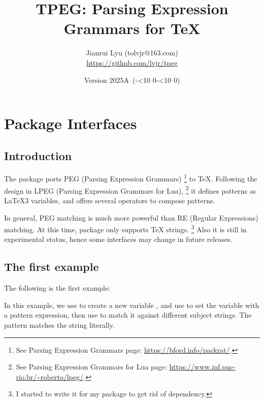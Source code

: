 \documentclass[oneside]{book}
\newcommand*{\myversion}{2025A}
\newcommand*{\mydate}{Version \myversion\ (\the\year-\mylpad\month-\mylpad\day)}
\newcommand*{\mylpad}[1]{\ifnum#1<10 0\the#1\else\the#1\fi}
\begin{document}
\title{\textsf{\color{green3}TPEG: Parsing Expression Grammars for TeX}}
\author{Jianrui Lyu (tolvjr@163.com)\\ \url{https://github.com/lvjr/tpeg}}
\date{\mydate}
\maketitle

\tableofcontents

\chapter{Package Interfaces}

\section{Introduction}

The  package ports PEG (Parsing Expression Grammars)%
\footnote{See Parsing Expression Grammars page: \url{https://bford.info/packrat/}.} to TeX.
Following the design in LPEG (Parsing Expression Grammars for Lua),%
\footnote{See Parsing Expression Grammars for Lua page: \url{https://www.inf.puc-rio.br/~roberto/lpeg/}.}
it defines patterns as LaTeX3 variables, and offers several operators to compose patterns.

In general, PEG matching is much more powerful than RE (Regular Expressions) matching.
At this time,  package only supports TeX strings.%
\footnote{I started to write it for my  package to get rid of  dependency.}
Also it is still in experimental status, hence some interfaces may change in future releases.

\section{The first example}

The following is the first example:
\begin{demohigh}
\NewTpeg\lMyTestTpeg
\SetTpeg{}
\IfTpegMatchTF{}
\IfTpegMatchTF{}
\IfTpegMatchTF{}
\IfTpegMatchTF{}
\end{demohigh}
In this example, we use \CC{\NewTpeg} to create a new  variable \VV{\lMyTestTpeg},
and use \CC{\SetTpeg} to set the variable with a pattern expression,
then use \CC{\IfTpegMatchTF} to match it against different subject strings.
The pattern  matches the string  literally.
\end{document}
